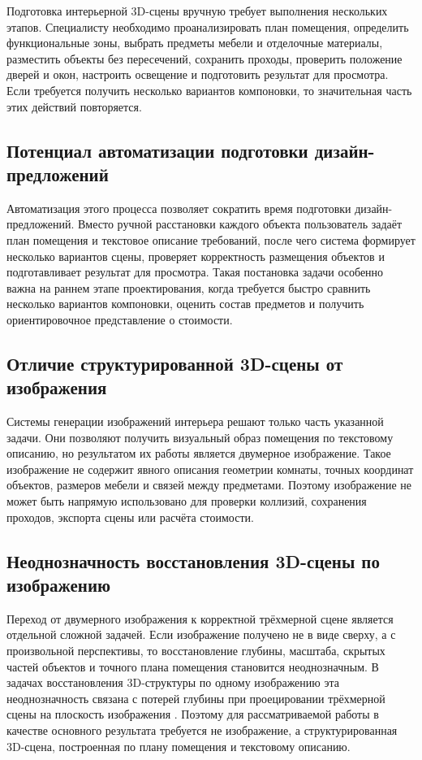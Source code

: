 \documentclass[times]{itmo-student-thesis}
\begin{document}
Подготовка интерьерной 3D-сцены вручную требует выполнения нескольких этапов. Специалисту необходимо проанализировать план помещения, определить функциональные зоны, выбрать предметы мебели и отделочные материалы, разместить объекты без пересечений, сохранить проходы, проверить положение дверей и окон, настроить освещение и подготовить результат для просмотра. Если требуется получить несколько вариантов компоновки, то значительная часть этих действий повторяется.

\subsection{Потенциал автоматизации подготовки дизайн-предложений}

Автоматизация этого процесса позволяет сократить время подготовки дизайн-предложений. Вместо ручной расстановки каждого объекта пользователь задаёт план помещения и текстовое описание требований, после чего система формирует несколько вариантов сцены, проверяет корректность размещения объектов и подготавливает результат для просмотра. Такая постановка задачи особенно важна на раннем этапе проектирования, когда требуется быстро сравнить несколько вариантов компоновки, оценить состав предметов и получить ориентировочное представление о стоимости.

\subsection{Отличие структурированной 3D-сцены от изображения}

Системы генерации изображений интерьера решают только часть указанной задачи. Они позволяют получить визуальный образ помещения по текстовому описанию, но результатом их работы является двумерное изображение. Такое изображение не содержит явного описания геометрии комнаты, точных координат объектов, размеров мебели и связей между предметами. Поэтому изображение не может быть напрямую использовано для проверки коллизий, сохранения проходов, экспорта сцены или расчёта стоимости.

\subsection{Неоднозначность восстановления 3D-сцены по изображению}

Переход от двумерного изображения к корректной трёхмерной сцене является отдельной сложной задачей. Если изображение получено не в виде сверху, а с произвольной перспективы, то восстановление глубины, масштаба, скрытых частей объектов и точного плана помещения становится неоднозначным. В задачах восстановления 3D-структуры по одному изображению эта неоднозначность связана с потерей глубины при проецировании трёхмерной сцены на плоскость изображения \cite{zeng2024rsa,wu2024direct3d}. Поэтому для рассматриваемой работы в качестве основного результата требуется не изображение, а структурированная 3D-сцена, построенная по плану помещения и текстовому описанию.
\end{document}
